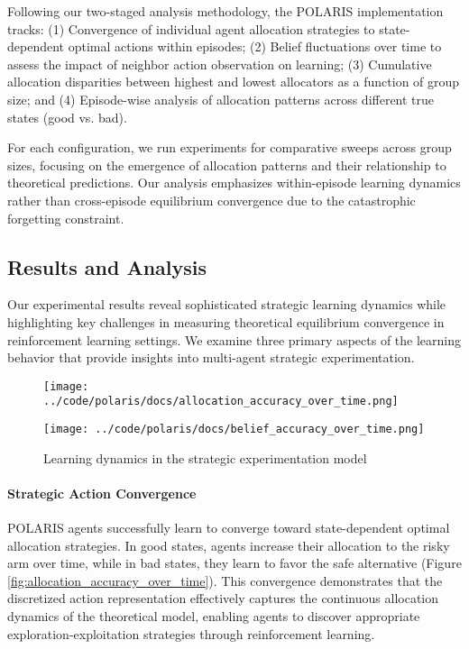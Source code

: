 Following our two-staged analysis methodology, the POLARIS implementation tracks: (1) Convergence of individual agent allocation strategies to state-dependent optimal actions within episodes; (2) Belief fluctuations over time to assess the impact of neighbor action observation on learning; (3) Cumulative allocation disparities between highest and lowest allocators as a function of group size; and (4) Episode-wise analysis of allocation patterns across different true states (good vs. bad).

For each configuration, we run experiments for comparative sweeps across group sizes, focusing on the emergence of allocation patterns and their relationship to theoretical predictions. Our analysis emphasizes within-episode learning dynamics rather than cross-episode equilibrium convergence due to the catastrophic forgetting constraint.

\subsection{Results and Analysis}

Our experimental results reveal sophisticated strategic learning dynamics while highlighting key challenges in measuring theoretical equilibrium convergence in reinforcement learning settings. We examine three primary aspects of the learning behavior that provide insights into multi-agent strategic experimentation.

\begin{figure}[!htbp]
    \centering
    \begin{minipage}[t]{0.48\textwidth}
        \centering
        \texttt{[image: ../code/polaris/docs/allocation\_accuracy\_over\_time.png]}
        \label{fig:allocation_accuracy_over_time}
    \end{minipage}
    \hfill
    \begin{minipage}[t]{0.48\textwidth}
        \centering
        \texttt{[image: ../code/polaris/docs/belief\_accuracy\_over\_time.png]}
        \label{fig:belief_accuracy_over_time}
    \end{minipage}
    \caption{Learning dynamics in the strategic experimentation model}
    \label{fig:strategic_experimentation_results}
\end{figure}

\paragraph{Strategic Action Convergence} POLARIS agents successfully learn to converge toward state-dependent optimal allocation strategies. In good states, agents increase their allocation to the risky arm over time, while in bad states, they learn to favor the safe alternative (Figure \ref{fig:allocation_accuracy_over_time}). This convergence demonstrates that the discretized action representation effectively captures the continuous allocation dynamics of the theoretical model, enabling agents to discover appropriate exploration-exploitation strategies through reinforcement learning.

